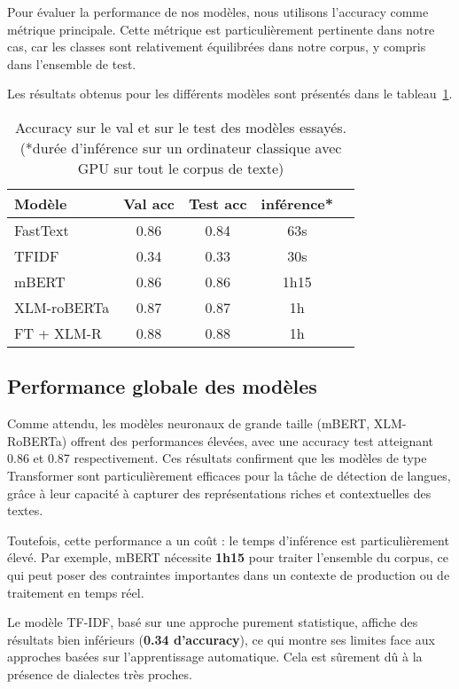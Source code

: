 

Pour évaluer la performance de nos modèles, nous utilisons l'accuracy comme métrique principale. Cette métrique est particulièrement pertinente dans notre cas, car les classes sont relativement équilibrées dans notre corpus, y compris dans l'ensemble de test.

Les résultats obtenus pour les différents modèles sont présentés dans le tableau~\ref{tab:results}.

\begin{table}[ht]
    \centering
    \begin{tabular}{lcccc}
        \toprule
        Modèle & Val acc & Test acc  & inférence* \\
        \midrule
        FastText & 0.86 & 0.84 & 63s \\
        TFIDF & 0.34 & 0.33 & 30s \\
        mBERT & 0.86 & 0.86 & 1h15 \\
        XLM-roBERTa & 0.87 & 0.87 & 1h \\
        FT + XLM-R & 0.88 & 0.88 & 1h \\
        \bottomrule
    \end{tabular}

    \caption{Accuracy sur le val et sur le test des modèles essayés. (*durée d'inférence sur un ordinateur classique avec GPU sur tout le corpus de texte)}
    
    \label{tab:results}
\end{table}
\subsection{Performance globale des modèles}

Comme attendu, les modèles neuronaux de grande taille (mBERT, XLM-RoBERTa) offrent des performances élevées, avec une accuracy test atteignant 0.86 et 0.87 respectivement. Ces résultats confirment que les modèles de type Transformer sont particulièrement efficaces pour la tâche de détection de langues, grâce à leur capacité à capturer des représentations riches et contextuelles des textes.

Toutefois, cette performance a un coût : le temps d'inférence est particulièrement élevé. Par exemple, mBERT nécessite \textbf{1h15} pour traiter l'ensemble du corpus, ce qui peut poser des contraintes importantes dans un contexte de production ou de traitement en temps réel.

Le modèle TF-IDF, basé sur une approche purement statistique, affiche des résultats bien inférieurs (\textbf{0.34 d’accuracy}), ce qui montre ses limites face aux approches basées sur l’apprentissage automatique. Cela est sûrement dû à la présence de dialectes très proches.

